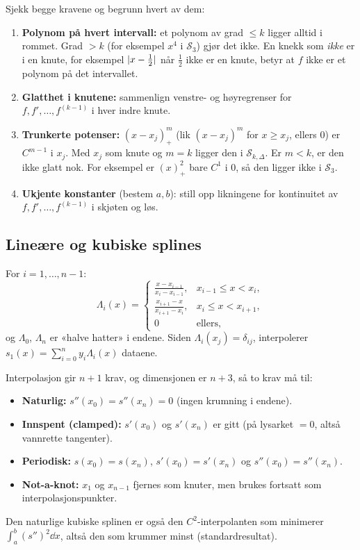 \begin{oppskrift}
Sjekk begge kravene og begrunn hvert av dem:
\begin{enumerate}
  \item \textbf{Polynom på hvert intervall:} et polynom av grad $\le k$ ligger alltid i rommet. Grad $>k$ (for eksempel $x^4$ i $\mathcal S_3$) gjør det ikke. En knekk som \emph{ikke} er i en knute, for eksempel $\lvert x-\frac12\rvert$ når $\frac12$ ikke er en knute, betyr at $f$ ikke er et polynom på det intervallet.
  \item \textbf{Glatthet i knutene:} sammenlign venstre- og høyregrenser for $f,f',\dots,f^{(k-1)}$ i hver indre knute.
  \item \textbf{Trunkerte potenser:} $(x-x_j)_+^m$ (lik $(x-x_j)^m$ for $x\ge x_j$, ellers $0$) er $C^{m-1}$ i $x_j$. Med $x_j$ som knute og $m=k$ ligger den i $\mathcal S_{k,\Delta}$. Er $m<k$, er den ikke glatt nok. For eksempel er $(x)_+^2$ bare $C^1$ i $0$, så den ligger ikke i $\mathcal S_3$.
  \item \textbf{Ukjente konstanter} (bestem $a,b$): still opp likningene for kontinuitet av $f,f',\dots,f^{(k-1)}$ i skjøten og løs.
\end{enumerate}
\end{oppskrift}

\subsection{Lineære og kubiske splines}
\begin{defn}
For $i=1,\dots,n-1$:
\[
\Lambda_i(x)=\begin{cases}\frac{x-x_{i-1}}{x_i-x_{i-1}},&x_{i-1}\le x<x_i,\\ \frac{x_{i+1}-x}{x_{i+1}-x_i},&x_i\le x<x_{i+1},\\0&\text{ellers},\end{cases}
\]
og $\Lambda_0$, $\Lambda_n$ er «halve hatter» i endene. Siden $\Lambda_i(x_j)=\delta_{ij}$, interpolerer $s_1(x)=\sum_{i=0}^ny_i\Lambda_i(x)$ dataene.
\end{defn}

\begin{defn}
Interpolasjon gir $n+1$ krav, og dimensjonen er $n+3$, så to krav må til:
\begin{itemize}
  \item \textbf{Naturlig:} $s''(x_0)=s''(x_n)=0$ (ingen krumning i endene).
  \item \textbf{Innspent (clamped):} $s'(x_0)$ og $s'(x_n)$ er gitt (på lysarket $=0$, altså vannrette tangenter).
  \item \textbf{Periodisk:} $s(x_0)=s(x_n)$, $s'(x_0)=s'(x_n)$ og $s''(x_0)=s''(x_n)$.
  \item \textbf{Not-a-knot:} $x_1$ og $x_{n-1}$ fjernes som knuter, men brukes fortsatt som interpolasjonspunkter.
\end{itemize}
Den naturlige kubiske splinen er også den $C^2$-interpolanten som minimerer $\int_a^b(s'')^2\dd x$, altså den som krummer minst (standardresultat).
\end{defn}

